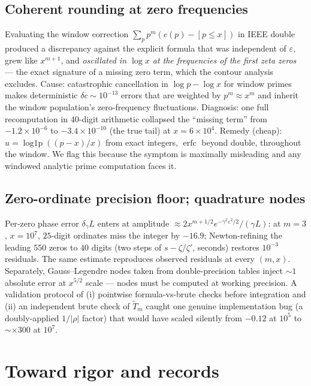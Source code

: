 \documentclass[11pt]{article}
\newcommand{\erfc}{\operatorname{erfc}}
\newcommand{\eps}{\varepsilon}
\begin{document}
\subsection{Coherent rounding at zero frequencies}
Evaluating the window correction $\sum_p p^m(c(p)-[p\le x])$ in IEEE double
produced a discrepancy against the explicit formula that was independent of
$\eps$, grew like $x^{m+1}$, and \emph{oscillated in $\log x$ at the
frequencies of the first zeta zeros} --- the exact signature of a missing
zero term, which the contour analysis excludes. Cause: catastrophic
cancellation in $\log p-\log x$ for window primes makes deterministic
$\delta c\sim10^{-13}$ errors that are weighted by $p^m\approx x^m$ and
inherit the window population's zero-frequency fluctuations. Diagnosis: one
full recomputation in $40$-digit arithmetic collapsed the ``missing term''
from $-1.2\times10^{-6}$ to $-3.4\times10^{-10}$ (the true tail) at
$x=6\times10^4$. Remedy (cheap): $u=\operatorname{log1p}((p-x)/x)$ from
exact integers, $\erfc$ beyond double, throughout the window. We flag this
because the symptom is maximally misleading and any windowed analytic prime
computation faces it.

\subsection{Zero-ordinate precision floor; quadrature nodes}
Per-zero phase error $\delta_\gamma L$ enters at amplitude
$\approx2x^{m+1/2}e^{-\gamma^2\eps^2/2}/(\gamma L)$: at $m=3$, $x=10^7$,
$25$-digit ordinates miss the integer by $-16.9$; Newton-refining the
leading $550$ zeros to $40$ digits (two steps of $s-\zeta/\zeta'$, seconds)
restores $10^{-3}$ residuals. The same estimate reproduces observed
residuals at every $(m,x)$. Separately, Gauss--Legendre nodes taken from
double-precision tables inject $\sim1$ absolute error at $x^{5/2}$ scale
--- nodes must be computed at working precision. A validation protocol of
(i) pointwise formula-vs-brute checks before integration and (ii) an
independent brute check of $\widetilde T_m$ caught one genuine
implementation bug (a doubly-applied $1/|\rho|$ factor) that would have
scaled silently from $-0.12$ at $10^5$ to $\sim\times300$ at $10^7$.

\section{Toward rigor and records}\label{sec:rigor}
\end{document}
